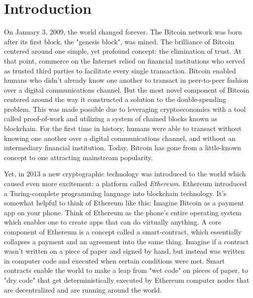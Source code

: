 \documentclass{article}
\begin{document}
\section{Introduction}
On January 3, 2009, the world changed forever. The Bitcoin network was born after its first block, the "genesis block", was mined. The brilliance of Bitcoin centered around one simple, yet profound concept: the elimination of trust. At that point, commerce on the Internet relied on financial institutions who served as trusted third parties to facilitate every single transaction. Bitcoin enabled humans who didn't already know one another to transact in peer-to-peer fashion over a digital communications channel. But the most novel component of Bitcoin centered around the way it constructed a solution to the double-spending problem. This was made possible due to leveraging \gls{cryptoeconomics} with a tool called \gls{proof-of-work} and utilizing a system of chained blocks known as blockchain. For the first time in history, humans were able to transact without knowing one another over a digital communications channel, and without an intermediary financial institution. Today, Bitcoin has gone from a little-known concept to one attracting mainstream popularity.

Yet, in 2013 a new cryptographic technology was introduced to the world which caused even more excitement: a platform called \textit{Ethereum}. Ethereum introduced a Turing-complete programming language into blockchain technology. It's somewhat helpful to think of Ethereum like this: Imagine Bitcoin as a payment app on your phone. Think of Ethereum as the phone's entire operating system which enables one to create apps that can do virtually anything.
A core component of Ethereum is a concept called a \gls{smart-contract}, which essentially collapses a payment and an agreement into the same thing. Imagine if a contract wasn't written on a piece of paper and signed by hand, but instead was written in computer code and executed when certain conditions were met. Smart contracts enable the world to make a leap from "wet code" on pieces of paper, to "dry code" that get deterministically executed by Ethereum computer nodes that are decentralized and are running around the world.
\end{document}
